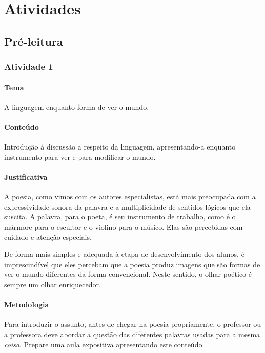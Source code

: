 \documentclass[11pt]{extarticle}
\begin{document}
\section{Atividades}

\subsection{Pré-leitura}

\subsubsection{Atividade 1}


\paragraph{Tema} A linguagem enquanto forma de ver o mundo. 

\paragraph{Conteúdo} Introdução à discussão a respeito da 
linguagem, apresentando-a enquanto instrumento para ver e
para modificar o mundo.

\paragraph{Justificativa} A poesia, como vimos com os autores especialistas,
está mais preocupada com a expressividade sonora da palavra e a multiplicidade
de sentidos lógicos que ela suscita. A palavra, para o poeta,
é seu instrumento de trabalho, como é o mármore para o escultor
e o violino para o músico. Elas são percebidas com cuidado e atenção
especiais. 

De forma mais simples e adequada à etapa de desenvolvimento dos alunos,
é imprescindível que eles percebam que a poesia produz imagens 
que são formas de ver o mundo diferentes da forma convencional.
Neste sentido, o olhar poético é sempre um olhar enriquecedor. 

\paragraph{Metodologia} Para introduzir o assunto, antes de chegar na poesia
propriamente, o professor ou a professora deve abordar a questão das
diferentes palavras usadas para a mesma \textit{coisa}. 
Prepare uma aula expositiva apresentando este conteúdo. 
\end{document}
